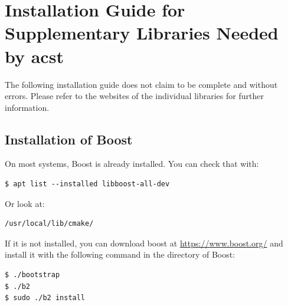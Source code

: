\chapter{Installation Guide for Supplementary Libraries Needed by acst}\label{ch:installationGuideSupplementaryLibraries}

The following installation guide does not claim to be complete and without errors. Please refer to the websites of the individual libraries for further information.

\section{Installation of Boost}
On most systems, Boost is already installed. You can check that with:
\begin{lstlisting}[basicstyle=\ttfamily\scriptsize,backgroundcolor={\color{gray!30}}, escapechar=!]
$ apt list --installed libboost-all-dev	
\end{lstlisting}
Or look at:
\begin{lstlisting}[basicstyle=\ttfamily\scriptsize,backgroundcolor={\color{gray!30}}, escapechar=!]
/usr/local/lib/cmake/
\end{lstlisting}

If it is not installed, you can download boost at \url{https://www.boost.org/} and install it with the following command in the directory of Boost:
\begin{lstlisting}[basicstyle=\ttfamily\scriptsize,backgroundcolor={\color{gray!30}}, escapechar=!]
$ ./bootstrap
$ ./b2
$ sudo ./b2 install
\end{lstlisting}




